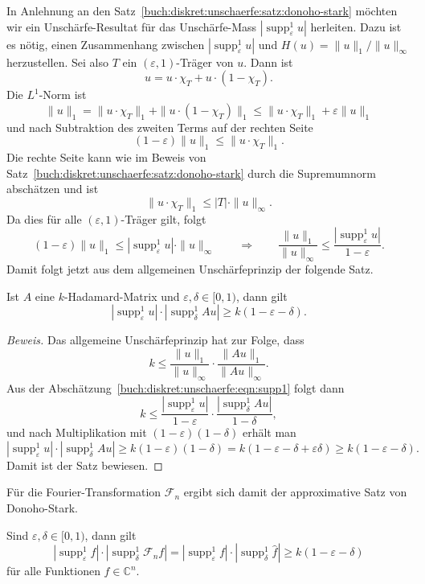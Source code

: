 In Anlehnung an den Satz~\ref{buch:diskret:unschaerfe:satz:donoho-stark}
möchten wir ein Unschärfe-Resultat für das Unschärfe-Mass
$|\operatorname{supp}_\varepsilon^1 u|$ herleiten.
Dazu ist es nötig, einen Zusammenhang zwischen
$|\operatorname{supp}_\varepsilon^1 u|$ und $H(u) = \|u\|_1/\|u\|_\infty$ 
herzustellen.
Sei also $T$ ein $(\varepsilon,1)$-Träger von $u$.
Dann ist
\[
u = u\cdot \chi_T + u\cdot (1-\chi_T).
\]
Die $L^1$-Norm ist
\[
\|u\|_1
=
\|u\cdot \chi_T\|_1
+
\|u\cdot (1-\chi_T)\|_1
\le
\|u\cdot \chi_T\|_1
+
\varepsilon \|u\|_1
\]
und nach Subtraktion des zweiten Terms auf der rechten Seite
\[
(1-\varepsilon)\|u\|_1 \le \|u\cdot\chi_T\|_1.
\]
Die rechte Seite kann wie im Beweis von
Satz~\ref{buch:diskret:unschaerfe:satz:donoho-stark}
durch die Supremumnorm abschätzen und ist
\[
\|u\cdot \chi_T\|_1 \le |T| \cdot \|u\|_\infty.
\]
Da dies für alle $(\varepsilon,1)$-Träger gilt, folgt
\begin{equation}
(1-\varepsilon) \|u\|_1
\le
|\operatorname{supp}_\varepsilon^1 u|\cdot \|u\|_\infty
\qquad
\Rightarrow
\qquad
\frac{\|u\|_1}{\|u\|_\infty}
\le
\frac{|\operatorname{supp}_\varepsilon^1 u|}{1-\varepsilon}.
\label{buch:diskret:unschaerfe:eqn:supp1}
\end{equation}
Damit folgt jetzt aus dem allgemeinen Unschärfeprinzip der folgende
Satz.

\begin{satz}
Ist $A$ eine $k$-Hadamard-Matrix und $\varepsilon,\delta\in [0,1)$,
dann gilt
\[
|\operatorname{supp}_\varepsilon^1 u|
\cdot
|\operatorname{supp}_\delta^1 Au|
\ge 
k(1-\varepsilon-\delta).
\]
\end{satz}

\begin{proof}[Beweis]
Das allgemeine Unschärfeprinzip hat zur Folge, dass
\[
k
\le
\frac{\|u\|_1}{\|u\|_\infty}
\cdot
\frac{\|Au\|_1}{\|Au\|_\infty}.
\]
Aus der Abschätzung~\eqref{buch:diskret:unschaerfe:eqn:supp1}
folgt dann
\[
k
\le
\frac{ |\operatorname{supp}_\varepsilon^1 u| }{ 1-\varepsilon }
\cdot
\frac{ |\operatorname{supp}_\delta^1 Au| }{ 1-\delta },
\]
und nach Multiplikation mit $(1-\varepsilon)(1-\delta)$ erhält man
\[
|\operatorname{supp}_\varepsilon^1 u|
\cdot
|\operatorname{supp}_\delta^1 Au|
\ge
k(1-\varepsilon)(1-\delta)
=
k(1-\varepsilon-\delta+\varepsilon\delta)
\ge
k(1-\varepsilon-\delta).
\]
Damit ist der Satz bewiesen.
\end{proof}

Für die Fourier-Transformation $\mathscr{F}_n$ ergibt sich damit 
der approximative Satz von Donoho-Stark.

\begin{satz}
Sind $\varepsilon,\delta\in[0,1)$, dann gilt
\[
|\operatorname{supp}_\varepsilon^1 f|
\cdot
|\operatorname{supp}_\delta^1 \mathscr{F}_nf|
=
|\operatorname{supp}_\varepsilon^1 f|
\cdot
|\operatorname{supp}_\delta^1 \hat{f}|
\ge
k(1-\varepsilon-\delta)
\]
für alle Funktionen $f\in\mathbb{C}^n$.
\end{satz}


